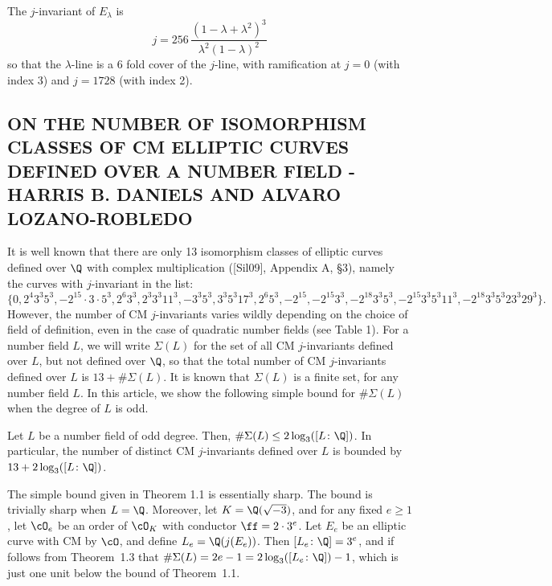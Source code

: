 The $j$-invariant of $E_\lambda$ is 
	\[
	j= 256\, \dfrac{(1 - \lambda + \lambda^2)^3}{\lambda^2(1 - \lambda)^2}
	\]
so that the $\lambda$-line is a 6 fold cover of the $j$-line, with ramification at $j= 0$ (with index 3) and $j= 1728$ (with index 2). 















\subsection{ON THE NUMBER OF ISOMORPHISM CLASSES OF CM ELLIPTIC CURVES DEFINED OVER A NUMBER FIELD - HARRIS B. DANIELS AND ALVARO LOZANO-ROBLEDO}

It is well known that there are only 13 isomorphism classes of elliptic curves defined over $\Q$ with complex multiplication ([Sil09], Appendix A, \S3), namely the curves with $j$-invariant in the list:
	\[
	\{ 0, 2^4 3^3 5^3, -2^{15} \cdot 3 \cdot 5^3, 2^6 3^3, 2^3 3^3 11^3, -3^3 5^3, 3^3 5^3 17^3, 2^6 5^3, -2^{15}, -2^{15} 3^3, -2^{18} 3^3 5^3, -2^{15} 3^3 5^3 11^3, -2^{18} 3^3 5^3 23^3 29^3 \}.
	\]
However, the number of CM $j$-invariants varies wildly depending on the choice of field of definition, even in the case of quadratic number fields (see Table 1). For a number field $L$, we will write $\Sigma(L)$ for the set of all CM $j$-invariants defined over $L$, but not defined over $\Q$, so that the total number of CM $j$-invariants defined over $L$
is $13 + \#\Sigma(L)$. It is known that $\Sigma(L)$ is a finite set, for any number field $L$. In this article, we show the following simple bound for $\#\Sigma(L)$ when the degree of $L$ is odd.


\begin{thm} %
Let $L$ be a number field of odd degree. Then, $\#\Sigma(L) \leq 2 \log_3([L \colon \Q])$. In particular, the number of distinct CM $j$-invariants defined over $L$ is bounded by $13 + 2\log_3([L \colon \Q])$. 
\end{thm}


\begin{rem} %
The simple bound given in Theorem 1.1 is essentially sharp. The bound is trivially sharp when $L= \Q$. Moreover, let $K= \Q(\sqrt{-3})$, and for any fixed $e \geq 1$, let $\cO_e$ be an order of $\cO_K$ with conductor $\ff= 2 \cdot 3^e$. Let $E_e$ be an elliptic curve with CM by $\cO$, and define $L_e= \Q(j(E_e))$. Then $[L_e \colon \Q]= 3^e$, and if follows from Theorem~1.3 that $\#\Sigma(L)= 2e - 1= 2\log_3([L_e \colon \Q]) - 1$, which is just one unit below the bound of Theorem~1.1. 
\end{rem}



